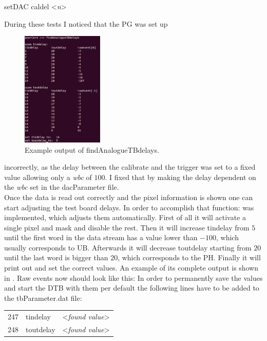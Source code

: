 \documentclass[british,11pt,a4paper]{memoir}
\begin{document}
\begin{itemize}
	\tri \ubuntu setDAC caldel <\textit{n}>
\end{itemize}\no\par
During these tests I noticed that the \ac{PG} was set up 
\begin{figure}
	\vspace*{-10pt}
	\includegraphics[width=3.9cm]{findDelay}
	\caption{Example output of findAnalogueTBdelays.}
	\label{pfinddel}
	\vspace*{-5pt}
\end{figure} 
incorrectly, as the delay between the calibrate and the trigger was set to a fixed value allowing only a  \textit{wbc} of $100$. I fixed that by making the delay dependent on the \textit{wbc} set in the dacParameter file.\\
Once the data is read out correctly and the pixel information is shown one can start adjusting the test board delays. In order to accomplish that function:
was implemented, which adjusts them automatically. First of all it will activate a single pixel and mask and disable the rest. Then it will increase tindelay from $5$ until the first word in the data stream has a value lower than $-100$, which usually corresponds to \ac{UB}. Afterwards it will decrease toutdelay starting from $20$ until the last word is bigger than $20$, which corresponds to the \ac{PH}. Finally it will print out and set the correct values. An example of its complete output is shown in . Raw events now should look like this:
\termi{[-196, 0, 97, -54, 57, 106, 164, 212, 91]} 
In order to permanently save the values and start the \ac{DTB} with them per default the following lines have to be added to the tbParameter.dat file:\s
{\ubuntu
\begin{tabular}{llr}
	247	&   tindelay	&  <\textit{found value}>\\
	248	&	toutdelay	&  <\textit{found value}>
\end{tabular}}\no\s
\end{document}
